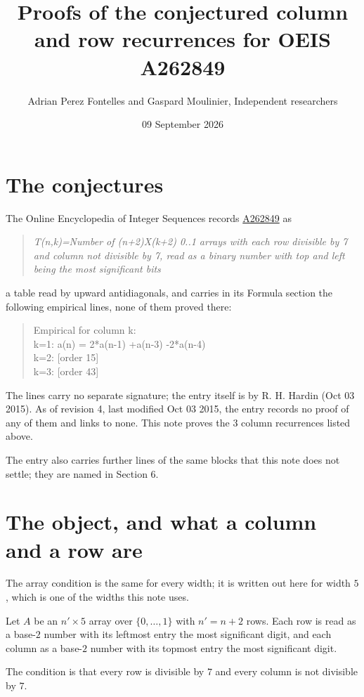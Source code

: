 \documentclass[11pt]{article}
\title{Proofs of the conjectured column and row recurrences for OEIS A262849}
\author{Adrian Perez Fontelles and Gaspard Moulinier, Independent researchers}
\date{09 September 2026}
\theoremstyle{definition}
\begin{document}
\maketitle
\section{The conjectures}

The Online Encyclopedia of Integer Sequences records \href{https://oeis.org/A262849}{A262849} as

\begin{quote}\itshape T(n,k)=Number of (n+2)X(k+2) 0..1 arrays with each row divisible by 7 and column not divisible by 7, read as a binary number with top and left being the most significant bits\end{quote}

a table read by upward antidiagonals, and carries in its Formula section the following empirical lines, none of them proved there:

\begin{quote}\ttfamily Empirical for column k:\\
k=1: a(n) = 2*a(n-1) +a(n-3) -2*a(n-4)\\k=2: [order 15]\\k=3: [order 43]\end{quote}

The lines carry no separate signature; the entry itself is by R. H. Hardin (Oct 03 2015). As of revision 4, last modified Oct 03 2015, the entry records no proof of any of them and links to none. This note proves the 3 column recurrences listed above.

The entry also carries further lines of the same blocks that this note does not settle; they are named in Section 6.

\section{The object, and what a column and a row are}

The array condition is the same for every width; it is written out here for width $5$, which is one of the widths this note uses.

Let $A$ be an $n' \times 5$ array over $\{0,\dots,1\}$ with $n' = n + 2$ rows. Each row is read as a base-$2$ number with its leftmost entry the most significant digit, and each column as a base-$2$ number with its topmost entry the most significant digit.

The condition is that every row is divisible by $7$ and every column is not divisible by $7$.
\end{document}
